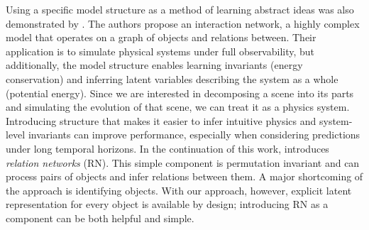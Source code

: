         
%
%
%   
        Using a specific model structure as a method of learning abstract ideas was also demonstrated by \cite{Battaglia2016}. The authors propose an interaction network, a highly complex model that operates on a graph of objects and relations between. Their application is to simulate physical systems under full observability, but additionally, the model structure enables learning invariants (\eg energy conservation) and inferring latent variables describing the system as a whole (\eg potential energy).
        Since we are interested in decomposing a scene into its parts and simulating the evolution of that scene, we can treat it as a physics system. Introducing structure that makes it easier to infer intuitive physics and system-level invariants can improve performance, especially when considering predictions under long temporal horizons.
        In the continuation of this work, \cite{Santoro2017} introduces \emph{relation networks} (RN). This simple component is permutation invariant and can process pairs of objects and infer relations between them. A major shortcoming of the approach is identifying objects. With our approach, however, explicit latent representation for every object is available by design; introducing RN as a component can be both helpful and simple.
